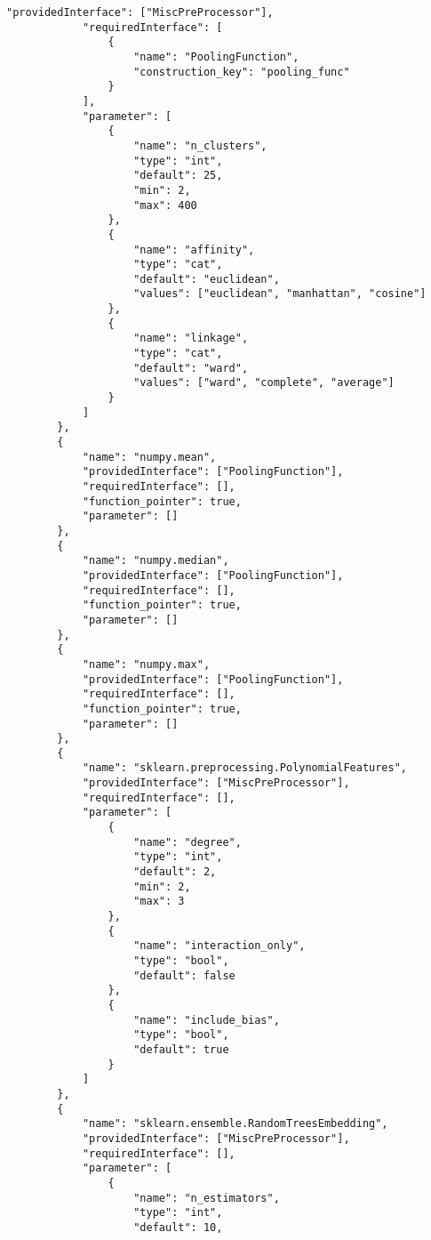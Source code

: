 \begin{Verbatim}[fontsize=\scriptsize]
            "providedInterface": ["MiscPreProcessor"],
            "requiredInterface": [
                {
                    "name": "PoolingFunction",
                    "construction_key": "pooling_func"
                }
            ],
            "parameter": [
                {
                    "name": "n_clusters",
                    "type": "int",
                    "default": 25,
                    "min": 2,
                    "max": 400
                },
                {
                    "name": "affinity",
                    "type": "cat",
                    "default": "euclidean",
                    "values": ["euclidean", "manhattan", "cosine"]
                },
                {
                    "name": "linkage",
                    "type": "cat",
                    "default": "ward",
                    "values": ["ward", "complete", "average"]
                }
            ]
        },
        {
            "name": "numpy.mean",
            "providedInterface": ["PoolingFunction"],
            "requiredInterface": [],
            "function_pointer": true,
            "parameter": []
        },
        {
            "name": "numpy.median",
            "providedInterface": ["PoolingFunction"],
            "requiredInterface": [],
            "function_pointer": true,
            "parameter": []
        },
        {
            "name": "numpy.max",
            "providedInterface": ["PoolingFunction"],
            "requiredInterface": [],
            "function_pointer": true,
            "parameter": []
        },
        {
            "name": "sklearn.preprocessing.PolynomialFeatures",
            "providedInterface": ["MiscPreProcessor"],
            "requiredInterface": [],
            "parameter": [
                {
                    "name": "degree",
                    "type": "int",
                    "default": 2,
                    "min": 2,
                    "max": 3
                },
                {
                    "name": "interaction_only",
                    "type": "bool",
                    "default": false
                },
                {
                    "name": "include_bias",
                    "type": "bool",
                    "default": true
                }
            ]
        },
        {
            "name": "sklearn.ensemble.RandomTreesEmbedding",
            "providedInterface": ["MiscPreProcessor"],
            "requiredInterface": [],
            "parameter": [
                {
                    "name": "n_estimators",
                    "type": "int",
                    "default": 10,

\end{Verbatim}
